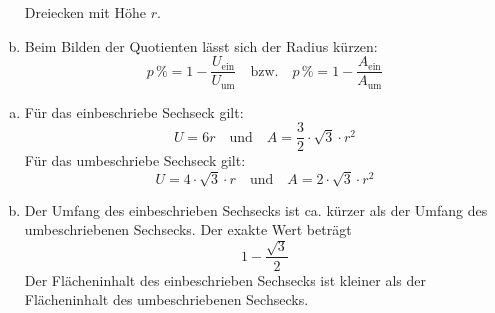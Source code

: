 \begin{exercise}
\begin{enumerate}[a)]
            Dreiecken mit Höhe $r$.
      \item Beim Bilden der Quotienten lässt sich der Radius kürzen:
            \begin{equation*}
              p\,\%=1-\frac{U_\text{ein}}{U_\text{um}}
              \quad\text{bzw.}\quad
              p\,\%=1-\frac{A_\text{ein}}{A_\text{um}}
            \end{equation*}
    \end{enumerate}
  \fi
  \ifoutcome\outcome
    \begin{enumerate}[a)]
      \item Für das einbeschriebe Sechseck gilt:
            \begin{equation*}
              U=6r
              \quad\text{und}\quad
              A=\frac{3}{2}\cdot\sqrt{3}\cdot r^2
            \end{equation*}
            Für das umbeschriebe Sechseck gilt:
            \begin{equation*}
              U=4\cdot\sqrt{3}\cdot r
              \quad\text{und}\quad
              A=2\cdot\sqrt{3}\cdot r^2
            \end{equation*}
      \item Der Umfang des einbeschrieben Sechsecks ist
            ca.  kürzer als der Umfang des
            umbeschriebenen Sechsecks. Der exakte Wert beträgt
            \begin{equation*}
              1-\frac{\sqrt{3}}{2}
            \end{equation*}
            Der Flächeninhalt des einbeschrieben Sechsecks ist
             kleiner als der Flächeninhalt des
            umbeschriebenen Sechsecks.
    \end{enumerate}
  \fi
\end{exercise}
